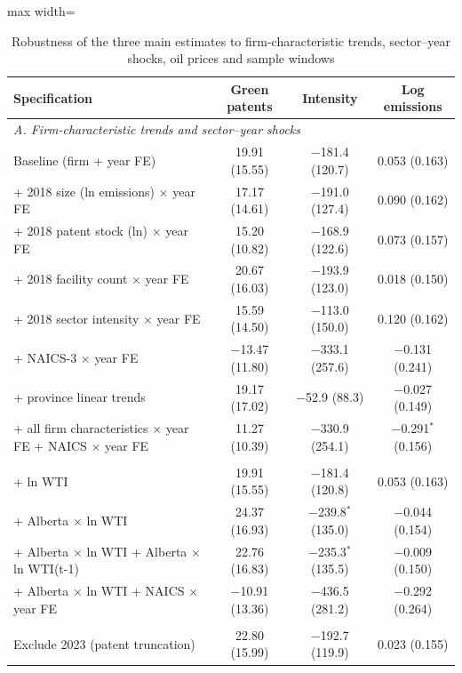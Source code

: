 \begin{table}[htbp]\centering\footnotesize
\caption{Robustness of the three main estimates to firm-characteristic trends, sector--year shocks, oil prices and sample windows}
\label{tab:robust}
\begin{adjustbox}{max width=\textwidth}
\begin{tabular}{lccc}
\toprule
Specification & Green patents & Intensity & Log emissions \\
\midrule
\multicolumn{4}{l}{\textit{A. Firm-characteristic trends and sector--year shocks}} \\
\quad Baseline (firm + year FE) & 19.91 (15.55) & $-$181.4 (120.7) & 0.053 (0.163) \\
\quad + 2018 size (ln emissions) $\times$ year FE & 17.17 (14.61) & $-$191.0 (127.4) & 0.090 (0.162) \\
\quad + 2018 patent stock (ln) $\times$ year FE & 15.20 (10.82) & $-$168.9 (122.6) & 0.073 (0.157) \\
\quad + 2018 facility count $\times$ year FE & 20.67 (16.03) & $-$193.9 (123.0) & 0.018 (0.150) \\
\quad + 2018 sector intensity $\times$ year FE & 15.59 (14.50) & $-$113.0 (150.0) & 0.120 (0.162) \\
\quad + NAICS-3 $\times$ year FE & $-$13.47 (11.80) & $-$333.1 (257.6) & $-$0.131 (0.241) \\
\quad + province linear trends & 19.17 (17.02) & $-$52.9 (88.3) & $-$0.027 (0.149) \\
\quad + all firm characteristics $\times$ year FE + NAICS $\times$ year FE & 11.27 (10.39) & $-$330.9 (254.1) & $-$0.291$^{*}$ (0.156) \\
\addlinespace
\multicolumn{4}{l}{\textit{B. Oil-price controls}} \\
\quad + ln WTI & 19.91 (15.55) & $-$181.4 (120.8) & 0.053 (0.163) \\
\quad + Alberta $\times$ ln WTI & 24.37 (16.93) & $-$239.8$^{*}$ (135.0) & $-$0.044 (0.154) \\
\quad + Alberta $\times$ ln WTI + Alberta $\times$ ln WTI(t-1) & 22.76 (16.83) & $-$235.3$^{*}$ (135.5) & $-$0.009 (0.150) \\
\quad + Alberta $\times$ ln WTI + NAICS $\times$ year FE & $-$10.91 (13.36) & $-$436.5 (281.2) & $-$0.292 (0.264) \\
\addlinespace
\multicolumn{4}{l}{\textit{C. Sample windows}} \\
\quad Exclude 2023 (patent truncation) & 22.80 (15.99) & $-$192.7 (119.9) & 0.023 (0.155) \\

\end{tabular}
\end{adjustbox}
\end{table}
